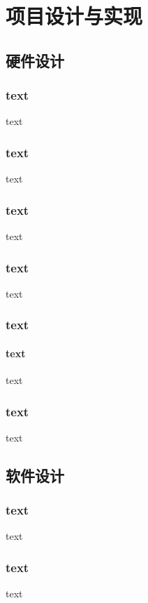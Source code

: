 
\section{项目设计与实现}

\subsection{硬件设计}

\subsubsection{text}
text
\subsubsection{text}
text
\subsubsection{text}
text
\subsubsection{text}
text
\subsubsection{text}
\paragraph{text}
text
\subsubsection{text}
text

\subsection{软件设计}
\subsubsection{text}
text
\subsubsection{text}
text
